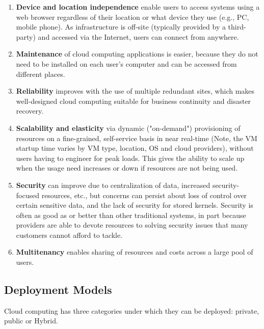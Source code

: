 \begin{enumerate}
    \item \textbf{Device and location independence} enable users to access systems using a web browser regardless of their location or what device they use (e.g., PC, mobile phone). As infrastructure is off-site (typically provided by a third-party) and accessed via the Internet, users can connect from anywhere.
    
    \item \textbf{Maintenance} of cloud computing applications is easier, because they do not need to be installed on each user's computer and can be accessed from different places.
    
    \item \textbf{Reliability} improves with the use of multiple redundant sites, which makes well-designed cloud computing suitable for business continuity and disaster recovery.
    
    \item \textbf{Scalability and elasticity} via dynamic ("on-demand") provisioning of resources on a fine-grained, self-service basis in near real-time (Note, the VM startup time varies by VM type, location, OS and cloud providers), without users having to engineer for peak loads. This gives the ability to scale up when the usage need increases or down if resources are not being used.
    
    \item \textbf{Security} can improve due to centralization of data, increased security-focused resources, etc., but concerns can persist about loss of control over certain sensitive data, and the lack of security for stored kernels. Security is often as good as or better than other traditional systems, in part because providers are able to devote resources to solving security issues that many customers cannot afford to tackle.
    
    \item \textbf{Multitenancy} enables sharing of resources and costs across a large pool of users.
    
\end{enumerate}

\subsection{Deployment Models}
Cloud computing has three categories under which they can be deployed: private, public or Hybrid.

